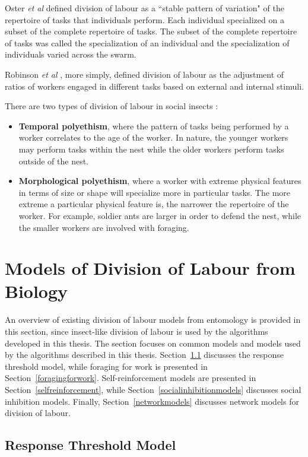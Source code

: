 Oster \textit{et al} \cite{oster1978caste} defined division of labour as a ``stable pattern of variation" of the repertoire of tasks that individuals perform. Each individual specialized on a subset of the complete repertoire of tasks. The subset of the complete repertoire of tasks was called the specialization of an individual and the specialization of individuals varied across the swarm. 

Robinson \textit{et al} \cite{robinson1992regulation}, more simply, defined division of labour as the adjustment of ratios of workers engaged in different tasks based on external and internal stimuli.

There are two types of division of labour in social insects \cite{beshers2001models}: 
\begin{itemize}
	\item \textbf{Temporal polyethism}, where the pattern of tasks being performed by a worker correlates to the age of the worker. In nature, the younger workers may perform tasks within the nest while the older workers perform tasks outside of the nest.
	\item \textbf{Morphological polyethism}, where a worker with extreme physical features in terms of size or shape will specialize more in particular tasks. The more extreme a particular physical feature is, the narrower the repertoire of the worker. For example, soldier ants are larger in order to defend the nest, while the smaller workers are involved with foraging.
\end{itemize}


\section{Models of Division of Labour from Biology}
\label{modelsofdivisionoflabourbiology}
An overview of existing division of labour models from entomology is provided in this section, since insect-like division of labour is used by the algorithms developed in this thesis. The section focuses on common models and models used by the algorithms described in this thesis. Section~\ref{responsethresholdmodel} discusses the response threshold model, while foraging for work is presented in Section~\ref{foragingforwork}. Self-reinforcement models are presented in Section~\ref{selfreinforcement}, while Section~\ref{socialinhibitionmodels} discusses social inhibition models. Finally, Section~\ref{networkmodels} discusses network models for division of labour.

\subsection{Response Threshold Model}
\label{responsethresholdmodel}

